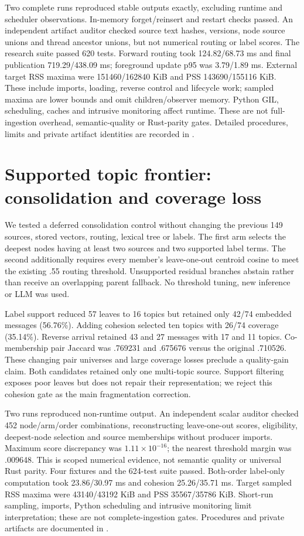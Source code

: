 \documentclass[11pt]{article}
\begin{document}
Two complete runs reproduced stable outputs exactly, excluding runtime and
scheduler observations. In-memory forget/reinsert and restart checks passed.
An independent artifact auditor checked source text hashes, versions, node
source unions and thread ancestor unions, but not numerical routing or label
scores. The research suite passed 620 tests. Forward routing took
124.82/68.73 ms and final publication 719.29/438.09 ms; foreground update p95
was 3.79/1.89 ms. External target RSS maxima were 151460/162840 KiB and PSS
143690/155116 KiB. These include imports, loading, reverse control and lifecycle
work; sampled maxima are lower bounds and omit children/observer memory.
Python GIL, scheduling, caches and intrusive monitoring affect runtime.
These are not full-ingestion overhead, semantic-quality or Rust-parity gates.
Detailed procedures, limits and private artifact identities are recorded in
.

\section{Supported topic frontier: consolidation and coverage loss}
We tested a deferred consolidation control without changing the previous
149 sources, stored vectors, routing, lexical tree or labels. The first arm
selects the deepest nodes having at least two sources and two supported label
terms. The second additionally requires every member's leave-one-out centroid
cosine to meet the existing .55 routing threshold. Unsupported residual
branches abstain rather than receive an overlapping parent fallback. No
threshold tuning, new inference or LLM was used.

Label support reduced 57 leaves to 16 topics but retained only 42/74 embedded
messages (56.76\%). Adding cohesion selected ten topics with 26/74 coverage
(35.14\%). Reverse arrival retained 43 and 27 messages with 17 and 11 topics.
Co-membership pair Jaccard was .769231 and .675676 versus the original
.710526. These changing pair universes and large coverage losses preclude a
quality-gain claim. Both candidates retained only one multi-topic source.
Support filtering exposes poor leaves but does not repair their representation;
we reject this cohesion gate as the main fragmentation correction.

Two runs reproduced non-runtime output. An independent scalar auditor checked
452 node/arm/order combinations, reconstructing leave-one-out scores,
eligibility, deepest-node selection and source memberships without producer
imports. Maximum score discrepancy was $1.11\times10^{-16}$; the nearest
threshold margin was .009648. This is scoped numerical evidence, not semantic
quality or universal Rust parity. Four fixtures and the 624-test suite passed.
Both-order label-only computation took 23.86/30.97 ms and cohesion
25.26/35.71 ms. Target sampled RSS maxima were 43140/43192 KiB and PSS
35567/35786 KiB. Short-run sampling, imports, Python scheduling and intrusive
monitoring limit interpretation; these are not complete-ingestion gates.
Procedures and private artifacts are documented in
.
\end{document}
